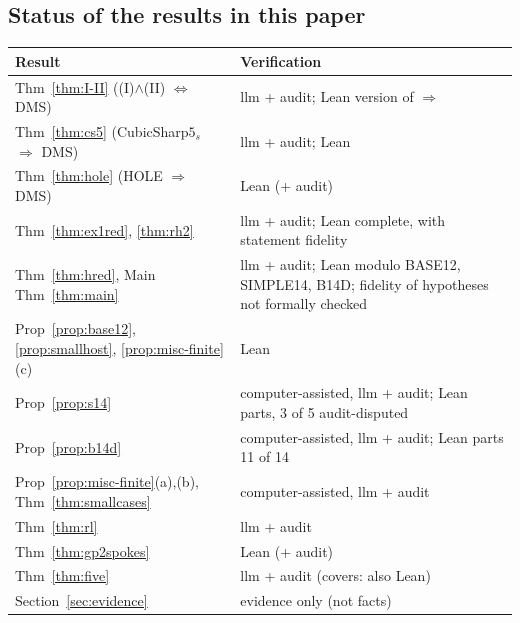 \documentclass[11pt]{amsart}
\theoremstyle{definition}
\theoremstyle{remark}
\newcommand{\Lean}{\textsf{Lean}}
\begin{document}
\subsection{Status of the results in this paper}
\begin{center}
\small
\begin{tabular}{@{}p{}p{}@{}}
\toprule
Result & Verification \\
\midrule
Thm~\ref{thm:I-II} ((I)$\wedge$(II) $\Leftrightarrow$ DMS) & llm + audit; \Lean{} version of $\Rightarrow$ \\
Thm~\ref{thm:cs5} (CubicSharp$5_s$ $\Rightarrow$ DMS) & llm + audit; \Lean{} \\
Thm~\ref{thm:hole} (HOLE $\Rightarrow$ DMS) & \Lean{} (+ audit) \\
Thm~\ref{thm:ex1red}, \ref{thm:rh2} & llm + audit; \Lean{} complete, with statement fidelity \\
Thm~\ref{thm:hred}, Main Thm~\ref{thm:main} & llm + audit; \Lean{} modulo BASE12, SIMPLE14, B14D; fidelity of hypotheses not formally checked \\
Prop~\ref{prop:base12}, \ref{prop:smallhost}, \ref{prop:misc-finite}(c) & \Lean{} \\
Prop~\ref{prop:s14} & computer-assisted, llm + audit; \Lean{} parts, 3 of 5 audit-disputed \\
Prop~\ref{prop:b14d} & computer-assisted, llm + audit; \Lean{} parts 11 of 14 \\
Prop~\ref{prop:misc-finite}(a),(b), Thm~\ref{thm:smallcases} & computer-assisted, llm + audit \\
Thm~\ref{thm:rl} & llm + audit \\
Thm~\ref{thm:gp2spokes} & \Lean{} (+ audit) \\
Thm~\ref{thm:five} & llm + audit (covers: also \Lean) \\
Section~\ref{sec:evidence} & evidence only (not facts) \\
\bottomrule
\end{tabular}
\end{center}
\end{document}
